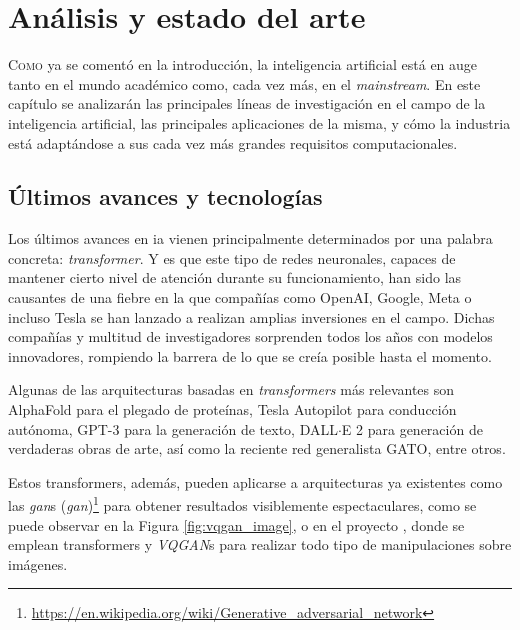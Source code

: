 \chapter{Análisis y estado del arte}
\label{chap:analisis_estado_arte}

\lettrine{C}{omo} ya se comentó en la introducción, la inteligencia artificial está en auge tanto en el mundo académico como, cada vez más, en el \textit{mainstream}. En este capítulo se analizarán las principales líneas de investigación en el campo de la inteligencia artificial, las principales aplicaciones de la misma, y cómo la industria está adaptándose a sus cada vez más grandes requisitos computacionales.

\section{Últimos avances y tecnologías}
\label{sec:ultimos_avances_tecnologias}
Los últimos avances en \acrshort{ia} vienen principalmente determinados por una palabra concreta: \textit{transformer}. Y es que este tipo de redes neuronales, capaces de mantener cierto nivel de atención \cite{vaswani2017attention_all_you_need} durante su funcionamiento, han sido las causantes de una fiebre en la que compañías como OpenAI, Google, Meta o incluso Tesla se han lanzado a realizan amplias inversiones en el campo. Dichas compañías y multitud de investigadores sorprenden todos los años con modelos innovadores, rompiendo la barrera de lo que se creía posible hasta el momento.

Algunas de las arquitecturas basadas en \textit{transformers} más relevantes son AlphaFold para el plegado de proteínas, Tesla Autopilot para conducción autónoma, GPT-3 para la generación de texto, DALL$\cdot$E 2 para generación de verdaderas obras de arte, así como la reciente red generalista GATO, entre otros.

Estos transformers, además, pueden aplicarse a arquitecturas ya existentes como las \textit{\acrshort{gan}}s (\textit{\acrlong{gan}})\footnote{\url{https://en.wikipedia.org/wiki/Generative\_adversarial\_network}} para obtener resultados visiblemente espectaculares, como se puede observar en la Figura \ref{fig:vqgan_image}, o en el proyecto \cite{chang2022maskgit}, donde se emplean transformers y \textit{VQGAN}s para realizar todo tipo de manipulaciones sobre imágenes.

